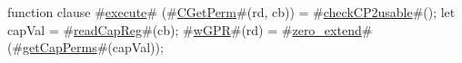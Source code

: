 function clause #\hyperref[zexecute]{execute}# (#\hyperref[zCGetPerm]{CGetPerm}#(rd, cb)) =
{
  #\hyperref[zcheckCP2usable]{checkCP2usable}#();
  let capVal = #\hyperref[zreadCapReg]{readCapReg}#(cb);
  #\hyperref[zwGPR]{wGPR}#(rd) = #\hyperref[zzzerozyextend]{zero\_extend}#(#\hyperref[zgetCapPerms]{getCapPerms}#(capVal));
}
